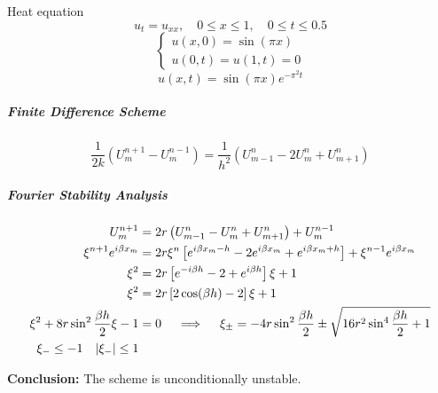 \begin{example}{Heat equation}{}
  \[
    u_t = u_{xx}, \quad 0 \leq x \leq 1, \quad 0 \leq t \leq 0.5
  \]
  \[
    \begin{cases}
      u(x, 0) = \sin(\pi x) \\
      u(0, t) = u(1, t) = 0
    \end{cases}
  \]
  \[
    u(x, t) = \sin(\pi x) e^{-\pi^2 t}
  \]

  \subparagraph{Finite Difference Scheme}
  \[
    \frac{1}{2k}\left( U_m^{n+1} - U_m^{n-1} \right) = \frac{1}{h^2}\left( U_{m-1}^n - 2U_m^n + U_{m+1}^n \right)
  \]



  \subparagraph{Fourier Stability Analysis}

  \begin{align*}
    U_m^{n+1}
     & =
    2r\left( U_{m-1}^n - U_m^n + U_{m+1}^n \right) + U_m^{n-1}               \\
    \xi^{n+1} e^{i\beta x_m}
     & =
    2r\xi^n
    \left[
      e^{i\beta x_m - h} - 2e^{i\beta x_m} + e^{i\beta x_m + h}
      \right]
    + \xi^{n-1} e^{i\beta x_m}                                               \\
    \xi^2
     & =
    2r\left[ e^{-i\beta h} - 2 + e^{i\beta h} \right]\xi + 1                 \\
    \xi^2
     & =
    2r \left[ 2\cos(\beta h) - 2 \right]\xi+ 1                               \\
    \xi^2 + 8r\sin^2 \frac{\beta h}{2}\xi - 1
     & =
    0 \quad  \implies \quad \xi_\pm
    =
    -4r\sin^2 \frac{\beta h}{2} \pm \sqrt{16r^2\sin^4 \frac{\beta h}{2} + 1} \\
    \xi_- \leq - 1
    \quad
    \lvert\xi_-\rvert \leq 1
  \end{align*}

  \textbf{Conclusion:} The scheme is unconditionally unstable.


\end{example}
